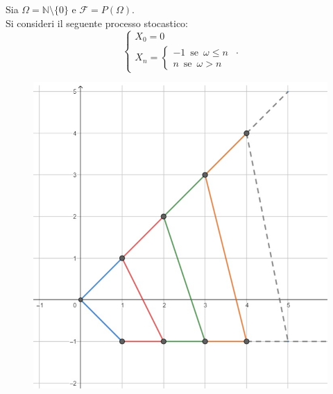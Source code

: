 \documentclass[12pt]{homework}
\begin{document}
  \section{}%
  Sia $\Omega=\mathbb{N}\setminus \{0\}$ e $\mathcal{F}=P\left(\Omega\right)$.\\
  Si consideri il seguente processo stocastico:
  \begin{equation*}
  \begin{cases} X_{0}=0\\X_{n}=\begin{cases}-1 \,\,\, \text{se} \,\,\, \omega\leq n\\n \,\,\, \text{se} \,\,\, \omega> n\end{cases} \end{cases}.
  \end{equation*}
  \begin{figure}[htb]\centering
\includegraphics[scale=0.50]{martingalaex5.jpg}
  \end{figure}
\end{document}
